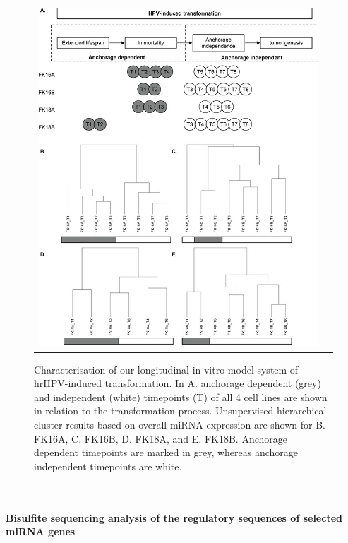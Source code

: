 \begin{figure}[h!]
\centering
\begin{tabular}{cc} 
\includegraphics[scale=2.5]{Figure1.jpg}
\end{tabular}
\caption{Characterisation of our longitudinal in vitro model system of hrHPV-induced transformation. In A. anchorage dependent (grey) and independent (white) timepoints (T) of all 4 cell lines are shown in relation to the transformation process. Unsupervised hierarchical cluster results based on overall miRNA expression are shown for B. FK16A, C. FK16B, D. FK18A, and E. FK18B. Anchorage dependent timepoints are marked in grey, whereas anchorage independent timepoints are white. }
\label{fig:figure1}
\end{figure}
\\
\\
\textbf{Bisulfite sequencing analysis of the regulatory sequences of selected miRNA genes}
\\
